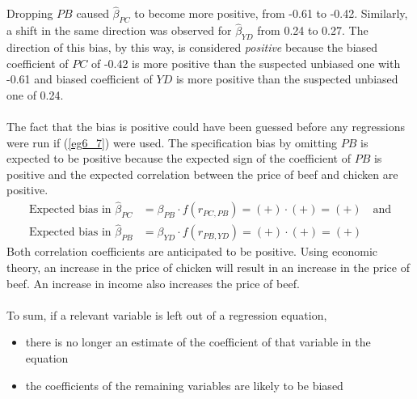 \documentclass[11pt]{article}
\begin{document}
Dropping $PB$ caused $\hat{\beta}_{PC}$ to become more positive, from -0.61 to -0.42. Similarly, a shift in the same direction was observed for $\hat{\beta}_{YD}$ from 0.24 to 0.27.  The direction of this bias, by this way, is considered \textit{positive} because the biased coefficient of $PC$ of -0.42 is more positive than the suspected unbiased one with -0.61 and biased coefficient of $YD$ is more positive than the suspected unbiased one of 0.24.\\ \\
The fact that the bias is positive could have been guessed before any regressions were run if (\ref{eg6_7}) were used. The specification bias by omitting $PB$ is expected to be positive because the expected sign of the coefficient of $PB$ is positive and the expected correlation between the price of beef and chicken are positive.
\begin{align*}
\text{Expected bias in } \hat{\beta}_{PC} &= \beta_{PB} \cdot f(r_{PC, PB}) = (+) \cdot (+) = (+) \quad \text{and}\\
\text{Expected bias in } \hat{\beta}_{PB} &= \beta_{YD} \cdot f(r_{PB, YD}) = (+) \cdot (+) = (+)
\end{align*}
Both correlation coefficients are anticipated to be positive. Using economic theory, an increase in the price of chicken will result in an increase in the price of beef. An increase in income also increases the price of beef.\\ \\
To sum, if a relevant variable is left out of a regression equation,
\begin{itemize}
\item there is no longer an estimate of the coefficient of that variable in the equation
\item the coefficients of the remaining variables are likely to be biased
\end{itemize}
\end{document}
